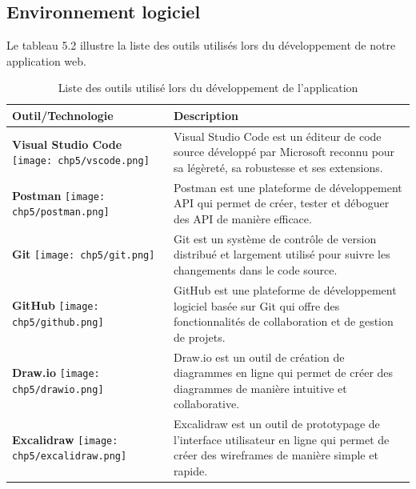 \subsection{Environnement logiciel}
Le tableau 5.2 illustre la liste des outils utilisés lors du développement de notre application web.
\begin{longtable}{|p{4cm}|p{11cm}|}
    \caption{Liste des outils utilisé lors du développement de l’application} \\
    \hline
        \rowcolor{gray!25}
        \textbf{Outil/Technologie} & \textbf{Description} \\
    \hline
    \centering \textbf{Visual Studio Code} \vspace{0.2cm} \newline \centering \texttt{[image: chp5/vscode.png]} & Visual Studio Code est un éditeur de code source développé par Microsoft reconnu pour sa légèreté, sa robustesse et ses extensions. \\
    \hline
    \centering \textbf{Postman} \vspace{0.2cm} \newline \centering \texttt{[image: chp5/postman.png]} & Postman est une plateforme de développement API qui permet de créer, tester et déboguer des API de manière efficace. \\
    \hline
    \centering \textbf{Git} \vspace{0.2cm} \newline \centering \texttt{[image: chp5/git.png]} & Git est un système de contrôle de version distribué et largement utilisé pour suivre les changements dans le code source. \\
    \hline
    \centering \textbf{GitHub} \vspace{0.2cm} \newline \centering \texttt{[image: chp5/github.png]} & GitHub est une plateforme de développement logiciel basée sur Git qui offre des fonctionnalités de collaboration et de gestion de projets. \\
    \hline
    \centering \textbf{Draw.io} \vspace{0.2cm} \newline \centering \texttt{[image: chp5/drawio.png]} & Draw.io est un outil de création de diagrammes en ligne qui permet de créer des diagrammes de manière intuitive et collaborative. \\
    \hline
    \centering \textbf{Excalidraw} \vspace{0.2cm} \newline \centering \texttt{[image: chp5/excalidraw.png]} & Excalidraw est un outil de prototypage de l'interface utilisateur en ligne qui permet de créer des wireframes de manière simple et rapide. \\

\end{longtable}
